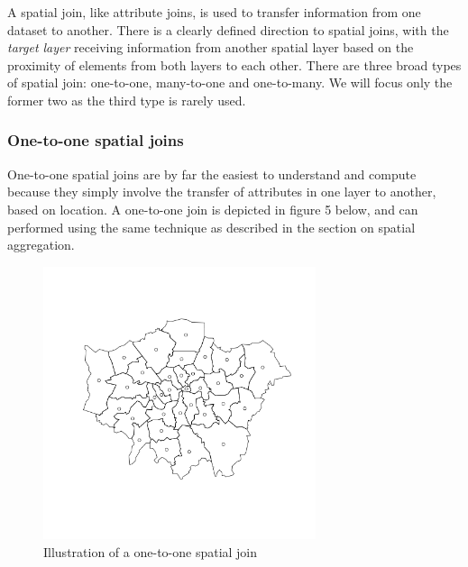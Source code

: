\documentclass[]{article}
\let\Oldincludegraphics\includegraphics
\renewcommand{\includegraphics}[1]{\Oldincludegraphics[width=8cm]{#1}}
\begin{document}
A spatial join, like attribute joins, is used to transfer information
from one dataset to another. There is a clearly defined direction to
spatial joins, with the \emph{target layer} receiving information from
another spatial layer based on the proximity of elements from both
layers to each other. There are three broad types of spatial join:
one-to-one, many-to-one and one-to-many. We will focus only the former
two as the third type is rarely used.

\subsubsection{One-to-one spatial joins}

One-to-one spatial joins are by far the easiest to understand and
compute because they simply involve the transfer of attributes in one
layer to another, based on location. A one-to-one join is depicted in
figure 5 below, and can performed using the same technique as described
in the section on spatial aggregation.

\begin{figure}[htbp]
\centering
\includegraphics{figure/Illustration_of_a_one-to-one_spatial_join_.png}
\caption{Illustration of a one-to-one spatial join}
\end{figure}
\end{document}
